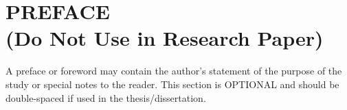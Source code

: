 


\chapter*{PREFACE \\
\small (Do Not Use in Research Paper)}

A preface or foreword may contain the author's statement of the purpose of the study or special notes to the reader.  This section is OPTIONAL and should be double-spaced if used in the thesis/dissertation. 


\newpage
